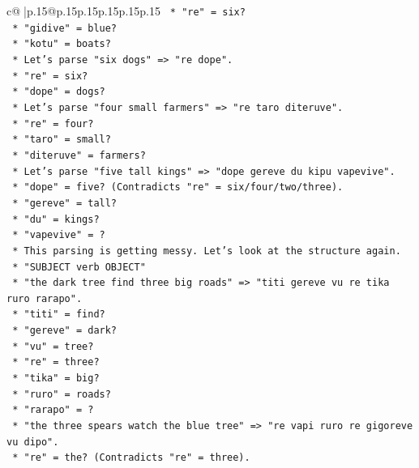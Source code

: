 \documentclass{article}
\begin{document}
{\begin{supertabular}{c@{$\;$}|p{.15\linewidth}@{}p{.15\linewidth}p{.15\linewidth}p{.15\linewidth}p{.15\linewidth}p{.15\linewidth}}
{{{\texttt{                *   "re" = six?} \\
\texttt{                *   "gidive" = blue?} \\
\texttt{                *   "kotu" = boats?} \\
\texttt{            *   Let's parse "six dogs" => "re dope".} \\
\texttt{                *   "re" = six?} \\
\texttt{                *   "dope" = dogs?} \\
\texttt{            *   Let's parse "four small farmers" => "re taro diteruve".} \\
\texttt{                *   "re" = four?} \\
\texttt{                *   "taro" = small?} \\
\texttt{                *   "diteruve" = farmers?} \\
\texttt{            *   Let's parse "five tall kings" => "dope gereve du kipu vapevive".} \\
\texttt{                *   "dope" = five? (Contradicts "re" = six/four/two/three).} \\
\texttt{                *   "gereve" = tall?} \\
\texttt{                *   "du" = kings?} \\
\texttt{                *   "vapevive" = ?} \\
\texttt{            *   This parsing is getting messy. Let's look at the structure again.} \\
\texttt{            *   "SUBJECT verb OBJECT"} \\
\texttt{            *   "the dark tree find three big roads" => "titi gereve vu re tika ruro rarapo".} \\
\texttt{                *   "titi" = find?} \\
\texttt{                *   "gereve" = dark?} \\
\texttt{                *   "vu" = tree?} \\
\texttt{                *   "re" = three?} \\
\texttt{                *   "tika" = big?} \\
\texttt{                *   "ruro" = roads?} \\
\texttt{                *   "rarapo" = ?} \\
\texttt{            *   "the three spears watch the blue tree" => "re vapi ruro re gigoreve vu dipo".} \\
\texttt{                *   "re" = the? (Contradicts "re" = three).} \\
}}}
\end{supertabular}}
\end{document}
